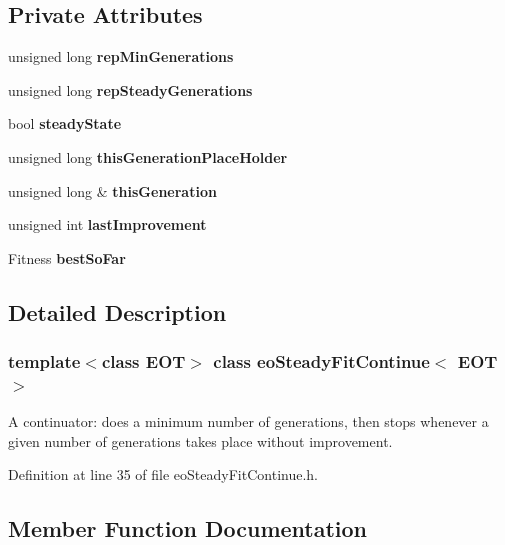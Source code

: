 \subsection*{Private Attributes}
\begin{CompactItemize}
\item 
unsigned long {\bf rep\-Min\-Generations}\label{classeo_steady_fit_continue_r0}

\item 
unsigned long {\bf rep\-Steady\-Generations}\label{classeo_steady_fit_continue_r1}

\item 
bool {\bf steady\-State}\label{classeo_steady_fit_continue_r2}

\item 
unsigned long {\bf this\-Generation\-Place\-Holder}\label{classeo_steady_fit_continue_r3}

\item 
unsigned long \& {\bf this\-Generation}\label{classeo_steady_fit_continue_r4}

\item 
unsigned int {\bf last\-Improvement}\label{classeo_steady_fit_continue_r5}

\item 
Fitness {\bf best\-So\-Far}\label{classeo_steady_fit_continue_r6}

\end{CompactItemize}


\subsection{Detailed Description}
\subsubsection*{template$<$class EOT$>$ class eo\-Steady\-Fit\-Continue$<$ EOT $>$}

A continuator: does a minimum number of generations, then stops whenever a given number of generations takes place without improvement. 



Definition at line 35 of file eo\-Steady\-Fit\-Continue.h.

\subsection{Member Function Documentation}
